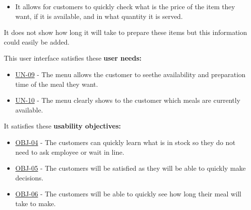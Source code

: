 \documentclass[]{VUMIFTemplateClass}
\begin{document}
\begin{itemize}
    \item It allows for customers to quickly check what is the price of the item they want, if it is available, and in what quantity it is served.
\end{itemize}

It does not show how long it will take to prepare these items but this information could easily be added.

This user interface satisfies these \textbf{user needs:}

\begin{itemize}
    \item \hyperref[UN-09]{UN-09} - The menu allows the customer to seethe availability and preparation time of the meal they want.
    \item \hyperref[UN-10]{UN-10} - The menu clearly shows to the customer which meals are currently available.
\end{itemize}

It satisfies these \textbf{usability objectives:}

\begin{itemize}
    \item \hyperref[OBJ-04]{OBJ-04} - The customers can quickly learn what is in stock so they do not need to ask employee or wait in line.
    \item \hyperref[OBJ-05]{OBJ-05} - The customers will be satisfied as they will be able to quickly make decisions.
    \item \hyperref[OBJ-06]{OBJ-06} - The customers will be able to quickly see how long their meal will take to make.
\end{itemize}
\end{document}
